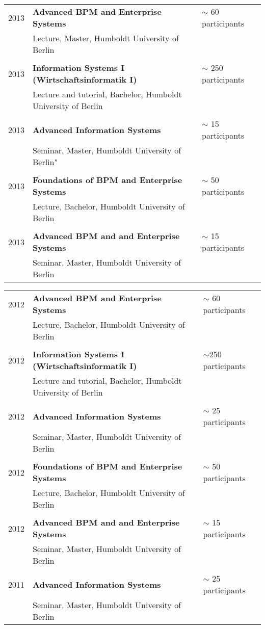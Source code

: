 \begin{tabular}{P{3cm}P{8cm}P{3cm}}
\\
2013		& \textbf{Advanced BPM and Enterprise Systems}			 & $\sim$ 60 participants \\
				& Lecture, Master, Humboldt University of Berlin \\
				\\
2013		& \textbf{Information Systems I (Wirtschaftsinformatik I)} 	 & $\sim$ 250 participants\\
				& Lecture and tutorial, Bachelor, Humboldt University of Berlin \\
				\\
2013		& \textbf{Advanced Information Systems	}			& $\sim$ 15 participants \\
				& Seminar, Master, Humboldt University of Berlin"\\
\\
2013		& \textbf{Foundations of BPM and Enterprise Systems}		  & $\sim$ 50 participants\\
				& Lecture, Bachelor, Humboldt University of Berlin\\
\\
2013		& \textbf{Advanced BPM and and Enterprise Systems}		& $\sim$ 15 participants\\
				& Seminar, Master, Humboldt University of Berlin\\
\end{tabular}
\begin{tabular}{P{3cm}P{8cm}P{3cm}}	
2012		& \textbf{Advanced BPM and Enterprise Systems}			 & $\sim$ 60 participants\\
				& Lecture, Bachelor, Humboldt University of Berlin\\
\\
2012		& \textbf{Information Systems I (Wirtschaftsinformatik I)} 	& $\sim$250 participants\\
				& Lecture and tutorial, Bachelor, Humboldt University of Berlin\\
\\
2012		& \textbf{Advanced Information Systems	}			& $\sim$ 25 participants\\
				& Seminar, Master, Humboldt University of Berlin\\
\\
2012		& \textbf{Foundations of BPM and Enterprise Systems}		 & $\sim$ 50 participants\\
				& Lecture, Bachelor, Humboldt University of Berlin\\
\\
2012		& \textbf{Advanced BPM and and Enterprise Systems}		& $\sim$ 15 participants\\
				& Seminar, Master, Humboldt University of Berlin\\
\\
2011		& \textbf{Advanced Information Systems	}			& $\sim$ 25 participants\\
				& Seminar, Master, Humboldt University of Berlin				\\
\end{tabular}
